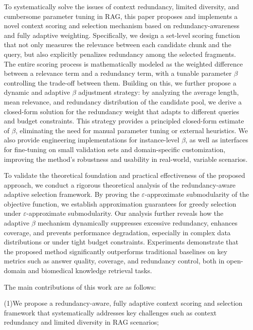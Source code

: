 \documentclass[11pt]{article}
\begin{document}
To systematically solve the issues of context redundancy, limited diversity, and cumbersome parameter tuning in RAG, this paper proposes and implements a novel context scoring and selection mechanism based on redundancy-awareness and fully adaptive weighting. Specifically, we design a set-level scoring function that not only measures the relevance between each candidate chunk and the query, but also explicitly penalizes redundancy among the selected fragments. The entire scoring process is mathematically modeled as the weighted difference between a relevance term and a redundancy term, with a tunable parameter $\beta$ controlling the trade-off between them. Building on this, we further propose a dynamic and adaptive $\beta$ adjustment strategy: by analyzing the average length, mean relevance, and redundancy distribution of the candidate pool, we derive a closed-form solution for the redundancy weight that adapts to different queries and budget constraints. This strategy provides a principled closed-form estimate of $\beta$, eliminating the need for manual parameter tuning or external heuristics. We also provide engineering implementations for instance-level $\beta$, as well as interfaces for fine-tuning on small validation sets and domain-specific customization, improving the method’s robustness and usability in real-world, variable scenarios.

To validate the theoretical foundation and practical effectiveness of the proposed approach, we conduct a rigorous theoretical analysis of the redundancy-aware adaptive selection framework. By proving the $\varepsilon $-approximate submodularity of the objective function, we establish approximation guarantees for greedy selection under $\varepsilon $-approximate submodularity. Our analysis further reveals how the adaptive $\beta$ mechanism dynamically suppresses excessive redundancy, enhances coverage, and prevents performance degradation, especially in complex data distributions or under tight budget constraints. Experiments demonstrate that the proposed method significantly outperforms traditional baselines on key metrics such as answer quality, coverage, and redundancy control, both in open-domain and biomedical knowledge retrieval tasks.

The main contributions of this work are as follows:

(1)We propose a redundancy-aware, fully adaptive context scoring and selection framework that systematically addresses key challenges such as context redundancy and limited diversity in RAG scenarios;
\end{document}
